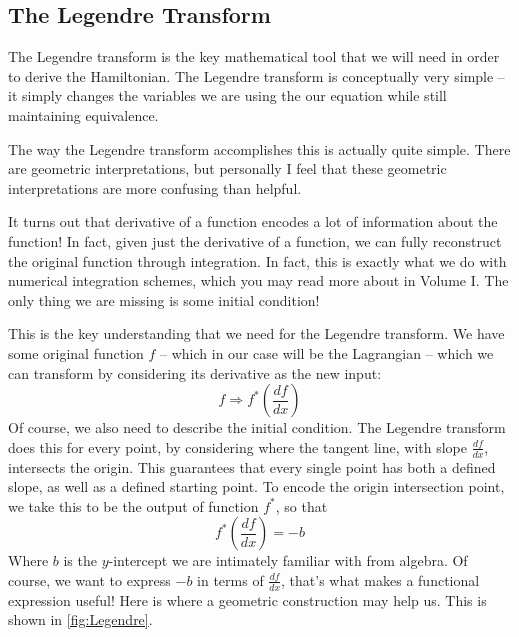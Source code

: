 \subsection{The Legendre Transform}
The Legendre transform is the key mathematical tool that we will need in order to derive the \gls{Hamiltonian}. The Legendre transform is conceptually very simple -- it simply changes the variables we are using the our equation while still maintaining equivalence.

The way the Legendre transform accomplishes this is actually quite simple. There are geometric interpretations, but personally I feel that these geometric interpretations are more confusing than helpful.

It turns out that derivative of a function encodes a lot of information about the function! In fact, given just the derivative of a function, we can fully reconstruct the original function through integration. In fact, this is exactly what we do with numerical integration schemes, which you may read more about in Volume I. The only thing we are missing is some initial condition!

This is the key understanding that we need for the Legendre transform. We have some original function $f$ -- which in our case will be the \gls{Lagrangian} -- which we can transform by considering its derivative as the new input:
$$f\Rightarrow f^*\left(\frac{df}{dx}\right)$$
Of course, we also need to describe the initial condition. The Legendre transform does this for every point, by considering where the tangent line, with slope $\frac{df}{dx}$, intersects the origin. This guarantees that every single point has both a defined slope, as well as a defined starting point. To encode the origin intersection point, we take this to be the output of function $f^*$, so that 
$$f^*\left(\frac{df}{dx}\right)=-b$$
Where $b$ is the $y$-intercept we are intimately familiar with from algebra. Of course, we want to express $-b$ in terms of $\frac{df}{dx}$, that's what makes a functional expression useful! Here is where a geometric construction may help us. This is shown in \autoref{fig:Legendre}.

